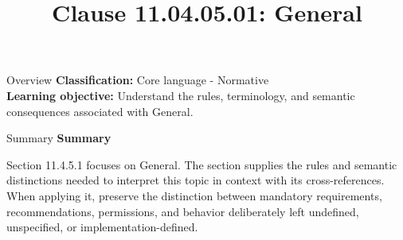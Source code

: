 \documentclass[10pt,letterpaper]{article}
\title{Clause 11.04.05.01: General}
\author{}
\date{}
\begin{document}
\maketitle
\begin{CornellOverviewBox}{Overview}
\textbf{Classification:} Core language - Normative\\[2pt]
\textbf{Learning objective:} Understand the rules, terminology, and semantic consequences associated with General.
\end{CornellOverviewBox}\begin{CornellSummaryBox}{Summary}
{\sffamily\bfseries\color{Accent} Summary}\par\vspace{3pt}Section 11.4.5.1 focuses on General. The section supplies the rules and semantic distinctions needed to interpret this topic in context with its cross-references. When applying it, preserve the distinction between mandatory requirements, recommendations, permissions, and behavior deliberately left undefined, unspecified, or implementation-defined.
\end{CornellSummaryBox}
\end{document}
